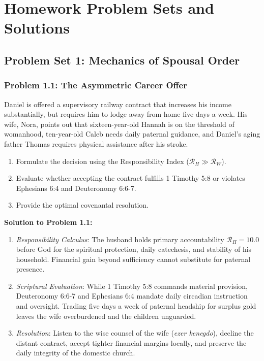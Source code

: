 \documentclass[11pt]{report}
\begin{document}
\chapter{Homework Problem Sets and Solutions}

\section{Problem Set 1: Mechanics of Spousal Order}

\subsection*{Problem 1.1: The Asymmetric Career Offer}
Daniel is offered a supervisory railway contract that increases his income substantially, but requires him to lodge away from home five days a week. His wife, Nora, points out that sixteen-year-old Hannah is on the threshold of womanhood, ten-year-old Caleb needs daily paternal guidance, and Daniel's aging father Thomas requires physical assistance after his stroke.
\begin{enumerate}
    \item Formulate the decision using the Responsibility Index ($\mathcal{R}_H \gg \mathcal{R}_W$).
    \item Evaluate whether accepting the contract fulfills 1 Timothy 5:8 or violates Ephesians 6:4 and Deuteronomy 6:6-7.
    \item Provide the optimal covenantal resolution.
\end{enumerate}

\begin{blackboard}
\textbf{Solution to Problem 1.1:}
\begin{enumerate}
    \item \textit{Responsibility Calculus}: The husband holds primary accountability $\mathcal{R}_H = 10.0$ before God for the spiritual protection, daily catechesis, and stability of his household. Financial gain beyond sufficiency cannot substitute for paternal presence.
    \item \textit{Scriptural Evaluation}: While 1 Timothy 5:8 commands material provision, Deuteronomy 6:6-7 and Ephesians 6:4 mandate daily circadian instruction and oversight. Trading five days a week of paternal headship for surplus gold leaves the wife overburdened and the children unguarded.
    \item \textit{Resolution}: Listen to the wise counsel of the wife (\textit{ezer kenegdo}), decline the distant contract, accept tighter financial margins locally, and preserve the daily integrity of the domestic church.
\end{enumerate}
\end{blackboard}
\end{document}
